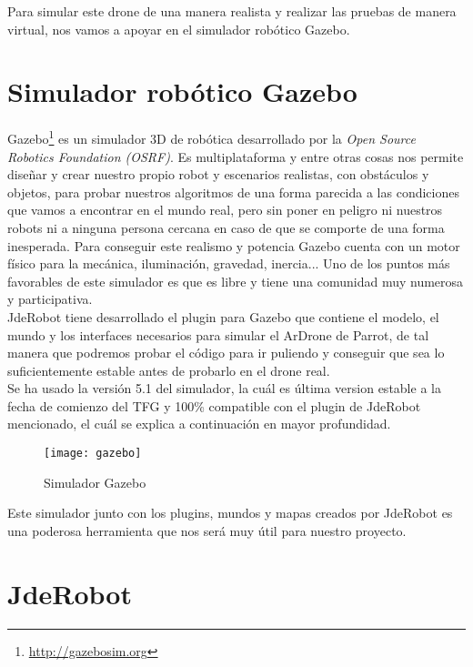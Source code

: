 Para simular este drone de una manera realista y realizar las pruebas de manera virtual, nos vamos a apoyar en el simulador robótico Gazebo.\\


\section{Simulador robótico Gazebo}

Gazebo\footnote{\url{http://gazebosim.org}} es un simulador 3D de robótica desarrollado por la \textit{Open Source Robotics Foundation (OSRF)}. Es multiplataforma y entre otras cosas nos permite diseñar y crear nuestro propio robot y escenarios realistas, con obstáculos y objetos, para probar nuestros algoritmos de una forma parecida a las condiciones que vamos a encontrar en el mundo real, pero sin poner en peligro ni nuestros robots ni a ninguna persona cercana en caso de que se comporte de una forma inesperada. Para conseguir este realismo y potencia Gazebo cuenta con un motor físico para la mecánica, iluminación, gravedad, inercia... Uno de los puntos más favorables de este simulador es que es libre y tiene una comunidad muy numerosa y participativa.\\

JdeRobot tiene desarrollado el plugin para Gazebo que contiene el modelo, el mundo y los interfaces necesarios para simular el ArDrone de Parrot, de tal manera que podremos probar el código para ir puliendo y conseguir que sea lo suficientemente estable antes de probarlo en el drone real.\\

Se ha usado la versión 5.1 del simulador, la cuál es última version estable a la fecha de comienzo del TFG y 100\% compatible con el plugin de JdeRobot mencionado, el cuál se explica a continuación en mayor profundidad.\\

\begin{figure}[h!]
\centering
\texttt{[image: gazebo]}
\caption{Simulador Gazebo}
\label{fig:gazebo}
\end{figure}

Este simulador junto con los plugins, mundos y mapas creados por JdeRobot es una poderosa herramienta que nos será muy útil para nuestro proyecto.\\

\section{JdeRobot}

